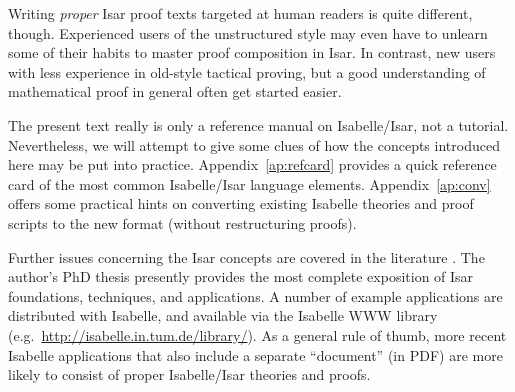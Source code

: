 Writing \emph{proper} Isar proof texts targeted at human readers is quite
different, though.  Experienced users of the unstructured style may even have
to unlearn some of their habits to master proof composition in Isar.  In
contrast, new users with less experience in old-style tactical proving, but a
good understanding of mathematical proof in general often get started easier.

\medskip The present text really is only a reference manual on Isabelle/Isar,
not a tutorial.  Nevertheless, we will attempt to give some clues of how the
concepts introduced here may be put into practice.  Appendix~\ref{ap:refcard}
provides a quick reference card of the most common Isabelle/Isar language
elements.  Appendix~\ref{ap:conv} offers some practical hints on converting
existing Isabelle theories and proof scripts to the new format (without
restructuring proofs).

Further issues concerning the Isar concepts are covered in the literature
\cite{Wenzel:1999:TPHOL,Wiedijk:2000:MV,Bauer-Wenzel:2000:HB,Bauer-Wenzel:2001}.
The author's PhD thesis \cite{Wenzel-PhD} presently provides the most complete
exposition of Isar foundations, techniques, and applications.  A number of
example applications are distributed with Isabelle, and available via the
Isabelle WWW library (e.g.\ \url{http://isabelle.in.tum.de/library/}).  As a
general rule of thumb, more recent Isabelle applications that also include a
separate ``document'' (in PDF) are more likely to consist of proper
Isabelle/Isar theories and proofs.

  

